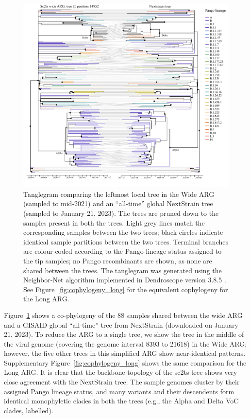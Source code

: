 \documentclass{article}
\begin{document}
\begin{figure} \centering
\includegraphics[width=\textwidth]{figures/cophylogeny_wide.pdf}
\caption{\label{fig:cophylogeny}
Tanglegram comparing the leftmost local tree in the Wide ARG
(sampled to mid-2021)
and an ``all-time'' global NextStrain tree (sampled to January 21, 2023). The
trees are pruned down to the samples present in both the trees. Light grey
lines match the corresponding samples between the two trees; black circles
indicate identical sample partitions between the two trees. Terminal branches
are colour-coded according to the Pango lineage status assigned to the tip
samples; no Pango recombinants are shown, as none are shared between the trees.
The tanglegram was generated using the Neighbor-Net algorithm
\citep{Scornavacca2011-mg} implemented in Dendroscope version 3.8.5
\citep{Huson2012-ys}. See Figure~\ref{fig:cophylogeny_long} for the equivalent
cophylogeny for the Long ARG.}
\end{figure}

Figure~\ref{fig:cophylogeny} shows a co-phylogeny of the 88 samples shared
between the wide ARG and a GISAID global ``all-time'' tree from NextStrain
(downloaded on January 21, 2023).
To reduce the ARG to a single tree, we show
the tree in the middle of the viral genome (covering the genome interval 8393 to 21618)
in the Wide ARG;
however, the five other trees in this
simplified ARG show near-identical patterns. Supplementary
Figure~\ref{fig:cophylogeny_long} shows the same comparison for the Long ARG.
It is clear that the backbone topology of the sc2ts tree shows very close
agreement with the NextStrain tree. The sample genomes cluster by their
assigned Pango lineage status, and many variants and their descendents form
identical monophyletic clades in both the trees (e.g., the Alpha and Delta VoC
clades, labelled).
\end{document}
